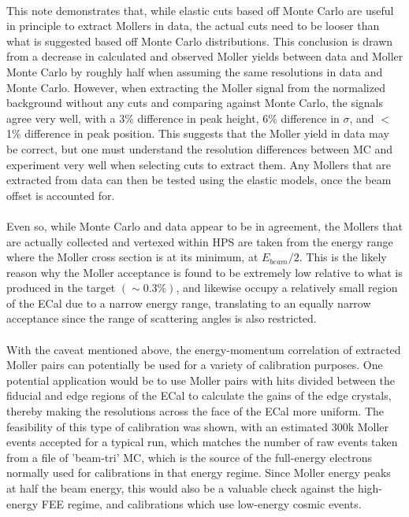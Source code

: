 \documentclass{article}
\begin{document}
	\paragraph{}
	This note demonstrates that, while elastic cuts based off Monte Carlo are useful in principle to extract Mollers in data, the actual cuts need to be looser than what is suggested based off Monte Carlo distributions. This conclusion is drawn from a decrease in calculated and observed Moller yields between data and Moller Monte Carlo by roughly half when assuming the same resolutions in data and Monte Carlo. However, when extracting the Moller signal from the normalized background without any cuts and comparing against Monte Carlo, the signals agree very well, with a 3\% difference in peak height, 6\% difference in $\sigma$, and $<$ 1\% difference in peak position. This suggests that the Moller yield in data may be correct, but one must understand the resolution differences between MC and experiment very well when selecting cuts to extract them. Any Mollers that are extracted from data can then be tested using the elastic models, once the beam offset is accounted for.
	\paragraph{}
Even so, while Monte Carlo and data appear to be in agreement, the Mollers that are actually collected and vertexed within HPS are taken from the energy range where the Moller cross section is at its minimum, at $E_{beam}/2$. This is the likely reason why the Moller acceptance is found to be extremely low relative to what is produced in the target $\left(\sim0.3\%\right)$, and likewise occupy a relatively small region of the ECal due to a narrow energy range, translating to an equally narrow acceptance since the range of scattering angles is also restricted.
	\paragraph{}
	With the caveat mentioned above, the energy-momentum correlation of extracted Moller pairs can potentially be used for a variety of calibration purposes. One potential application would be to use Moller pairs with hits divided between the fiducial and edge regions of the ECal to calculate the gains of the edge crystals, thereby making the resolutions across the face of the ECal more uniform. The feasibility of this type of calibration was shown, with an estimated 300k Moller events accepted for a typical run, which matches the number of raw events taken from a file of 'beam-tri' MC, which is the source of the full-energy electrons normally used for calibrations in that energy regime. Since Moller energy peaks at half the beam energy, this would also be a valuable check against the high-energy FEE regime, and calibrations which use low-energy cosmic events.
	
\end{document}
